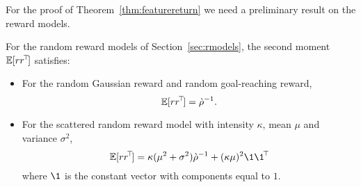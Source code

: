 \documentclass[11pt,a4paper]{article}
\newcommand{\drho}{\grave \rho}
\begin{document}
\bigskip

For the proof of Theorem~\ref{thm:featurereturn} we need a preliminary
result on the reward models.

\begin{prop}
\label{prop:Err}
For the random reward models of Section~\ref{sec:rmodels}, the second
moment $\mathbb{E}[rr^{\!\top}\!]$ satisfies:
\begin{itemize}
\item For the random Gaussian reward and random goal-reaching reward,
\begin{equation}
\E [r\transp{r}]=\drho^{-1}.
\end{equation}
\item For the scattered random reward model with intensity $\kappa$, mean $\mu$
and variance $\sigma^2$,
\begin{equation}
\E [r\transp{r}]=
\kappa (\mu^2+\sigma^2)\drho^{-1}+
(\kappa\mu)^2 \1\transp{\1}
\end{equation}
where $\1$ is the constant vector with components equal to $1$.
\end{itemize}
\end{prop}
\end{document}
